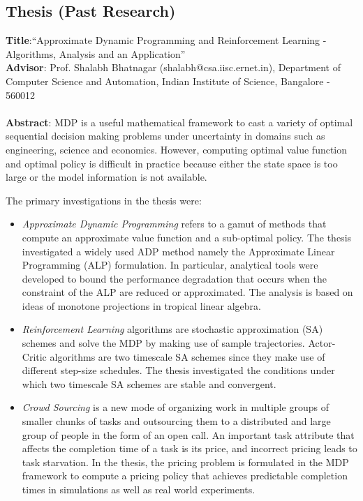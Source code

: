 \documentclass[line,margin]{res}
\begin{document}
\begin{resume}
\section{Thesis (Past Research)}
\textbf{Title}:``Approximate Dynamic Programming and Reinforcement Learning - Algorithms, Analysis and an Application''\\
\textbf{Advisor}: Prof. Shalabh Bhatnagar (shalabh@csa.iisc.ernet.in), Department of Computer Science and Automation, Indian Institute of Science, Bangalore - 560012\\
\\
\textbf{Abstract}: MDP is a useful mathematical framework to cast a variety of optimal sequential decision making problems under uncertainty in domains such as engineering, science and economics. However, computing optimal value function and optimal policy is difficult in practice because either the state space is too large or the model information is not available.\par
The primary investigations in the thesis were:
\begin{itemize}
\item \emph{Approximate Dynamic Programming} refers to a gamut of methods that compute an approximate value function and a sub-optimal policy. The thesis investigated a widely used ADP method namely the Approximate Linear Programming (ALP) formulation. In particular, analytical tools were developed to bound the performance degradation that occurs when the constraint of the ALP are reduced or approximated. The analysis is based on ideas of monotone projections in tropical linear algebra.
\item \emph{Reinforcement Learning} algorithms are stochastic approximation (SA) schemes and solve the MDP by making use of sample trajectories. Actor-Critic algorithms are two timescale SA schemes since they make use of different step-size schedules. The thesis investigated the conditions under which two timescale SA schemes are stable and convergent.
\item \emph{Crowd Sourcing} is a new mode of organizing work in multiple groups of smaller chunks of tasks and outsourcing them to a distributed and large group of people in the form of an open call. An important task attribute that affects the completion time of a task is its price, and incorrect pricing leads to task starvation. In the thesis, the pricing problem is formulated in the MDP framework to compute a pricing policy that achieves predictable completion times in simulations as well as real world experiments.

\end{itemize}
\end{resume}
\end{document}
